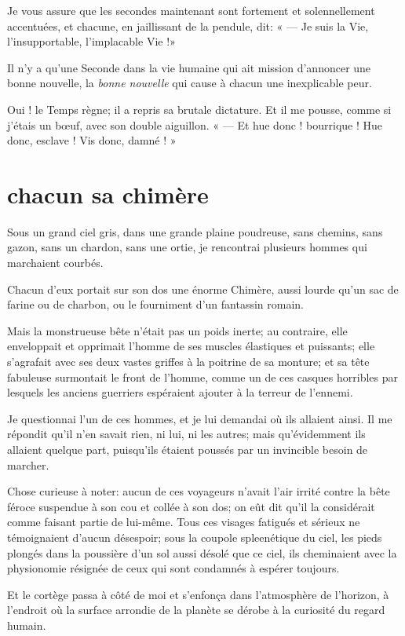 Je vous assure que les secondes maintenant sont fortement et
solennellement accentuées, et chacune, en jaillissant de la pendule,
dit: « --- Je suis la Vie, l’insupportable,
l’implacable Vie !»

Il n’y a qu’une Seconde dans la vie
humaine qui ait mission d’annoncer une bonne nouvelle,
la \textit{bonne nouvelle} qui cause à chacun une inexplicable peur.

Oui ! le Temps règne; il a repris sa brutale dictature. Et il me pousse, 
comme si j’étais un b\oe uf, avec son double aiguillon. 
« --- Et hue donc ! bourrique ! Hue donc, esclave ! Vis donc, damné ! » 


\quebra\section[Chacun sa chimère]{chacun sa chimère }

Sous un grand ciel gris, dans une grande plaine poudreuse, sans chemins,
sans gazon, sans un chardon, sans une ortie, je rencontrai plusieurs
hommes qui marchaient courbés.

Chacun d’eux portait sur son dos une énorme Chimère,
aussi lourde qu’un sac de farine ou de charbon, ou le
fourniment d’un fantassin romain.

Mais la monstrueuse bête n’était pas un poids inerte;
au contraire, elle enveloppait et opprimait l’homme de
ses muscles élastiques et puissants; elle s’agrafait
avec ses deux vastes griffes à la poitrine de sa monture; et sa tête
fabuleuse surmontait le front de l’homme, comme un de
ces casques horribles par lesquels les anciens guerriers espéraient
ajouter à la terreur de l’ennemi.

Je questionnai l’un de ces hommes, et je lui demandai
où ils allaient ainsi. Il me répondit qu’il
n’en savait rien, ni lui, ni les autres; mais
qu’évidemment ils allaient quelque part,
puisqu’ils étaient poussés par un invincible besoin de
marcher.

Chose curieuse à noter: aucun de ces voyageurs n’avait
l’air irrité contre la bête féroce suspendue à son cou
et collée à son dos; on eût dit qu’il la considérait
comme faisant partie de lui{}-même. Tous ces visages fatigués et
sérieux ne témoignaient d’aucun désespoir; sous la
coupole spleenétique du ciel, les pieds plongés dans la poussière
d’un sol aussi désolé que ce ciel, ils cheminaient
avec la physionomie résignée de ceux qui sont condamnés à espérer
toujours.

Et le cortège passa à côté de moi et s’enfonça dans
l’atmosphère de l’horizon, à
l’endroit où la surface arrondie de la planète se
dérobe à la curiosité du regard humain.

